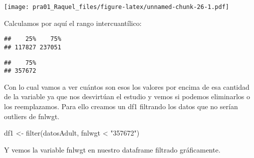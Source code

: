 \documentclass[]{article}
\newenvironment{Shaded}{\begin{snugshade}}{\end{snugshade}}
\newcommand{\DataTypeTok}[1]{\textcolor[rgb]{0.87,0.87,0.75}{#1}}
\newcommand{\DecValTok}[1]{\textcolor[rgb]{0.86,0.86,0.80}{#1}}
\newcommand{\FloatTok}[1]{\textcolor[rgb]{0.75,0.75,0.82}{#1}}
\newcommand{\KeywordTok}[1]{\textcolor[rgb]{0.94,0.87,0.69}{#1}}
\newcommand{\NormalTok}[1]{\textcolor[rgb]{0.80,0.80,0.80}{#1}}
\newcommand{\OperatorTok}[1]{\textcolor[rgb]{0.94,0.94,0.82}{#1}}
\newcommand{\StringTok}[1]{\textcolor[rgb]{0.80,0.58,0.58}{#1}}
\begin{document}
\texttt{[image: pra01\_Raquel\_files/figure-latex/unnamed-chunk-26-1.pdf]}

Calculamos por aquí el rango intercuantílico:

\begin{Shaded}
\end{Shaded}

\begin{verbatim}
##    25%    75% 
## 117827 237051
\end{verbatim}

\begin{Shaded}
\end{Shaded}

\begin{verbatim}
##    75% 
## 357672
\end{verbatim}

Con lo cual vamos a ver cuántos son esos los valores por encima de esa
cantidad de la variable ya que nos desvirtúan el estudio y vemos si
podemos eliminarlos o los reemplazamos. Para ello creamos un df1
filtrando los datos que no serían outliers de fnlwgt.

\begin{Shaded}
\begin{Highlighting}[]
\NormalTok{df1 \textless{}{-}}\StringTok{ }\KeywordTok{filter}\NormalTok{(datosAdult, fnlwgt }\OperatorTok{\textless{}}\StringTok{ "357672"}\NormalTok{)}
\end{Highlighting}
\end{Shaded}

Y vemos la variable fnlwgt en nuestro dataframe filtrado gráficamente.
\end{document}
